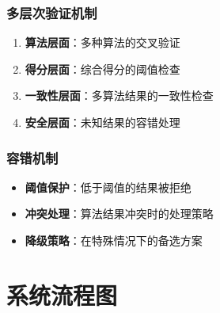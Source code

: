\documentclass[12pt]{article}
\begin{document}
\subsubsection{多层次验证机制}

\begin{enumerate}
    \item \textbf{算法层面}：多种算法的交叉验证
    \item \textbf{得分层面}：综合得分的阈值检查
    \item \textbf{一致性层面}：多算法结果的一致性检查
    \item \textbf{安全层面}：未知结果的容错处理
\end{enumerate}

\subsubsection{容错机制}

\begin{itemize}
    \item \textbf{阈值保护}：低于阈值的结果被拒绝
    \item \textbf{冲突处理}：算法结果冲突时的处理策略
    \item \textbf{降级策略}：在特殊情况下的备选方案
\end{itemize}

\section{系统流程图}
\end{document}
